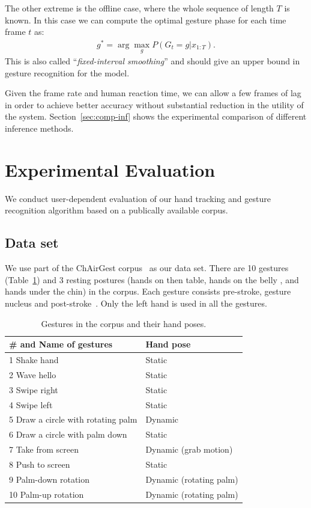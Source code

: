 \documentclass{acm_proc_article-sp}
\begin{document}
The other extreme is the offline case, where the whole sequence of length $T$ is known. In this case
we can compute the optimal gesture phase for each time frame $t$ as:
\begin{align*}
g^* = \arg\max_g P(G_t = g | x_{1 : T}).
\end{align*}
This is also called ``\textit{fixed-interval smoothing}'' and should give an 
upper bound in gesture recognition for the model.

Given the frame rate and human reaction time, we can allow a few frames of lag in order
to achieve better accuracy without substantial reduction in the utility of the system. 
Section~\ref{sec:comp-inf} shows the experimental comparison of different
inference methods.

\section{Experimental Evaluation}\label{sec:eval}
We conduct user-dependent evaluation of our hand tracking and gesture recognition algorithm based on
a publically available corpus.

\subsection{Data set}
We use part of the ChAirGest corpus~\cite{Ruffieux2013} as our data set. There are 10 gestures (Table~\ref{tab:gesture}) and
3 resting postures (hands on then table, hands on the belly , and hands under the chin) in the corpus. Each gesture consists
pre-stroke, gesture nucleus and post-stroke~\cite{Pavlovic97}. Only the left hand is used
in all the gestures. 

\begin{table}[tb]
\begin{center}
\caption{Gestures in the corpus and their hand poses. }
\label{tab:gesture}
\begin{tabular}{|l|l|}
\hline
\textbf{\# and Name of gestures} & \textbf{Hand pose} \\
\hline
1 Shake hand & Static \\
\hline
2 Wave hello & Static\\
\hline
3 Swipe right & Static \\
\hline
4 Swipe left &  Static \\
\hline
\multicolumn{1}{|p{0.38\columnwidth}|}{5 Draw a circle with rotating palm} & Dynamic\\
\hline
\multicolumn{1}{|p{0.38\columnwidth}|}{6 Draw a circle with palm down} & Static \\
\hline
7 Take from screen & Dynamic (grab motion) \\
\hline
8 Push to screen & Static \\
\hline
9 Palm-down rotation & Dynamic (rotating palm)\\
\hline
10 Palm-up rotation & Dynamic (rotating palm) \\
\hline
\end{tabular}
\end{center}
\end{table}
\end{document}
